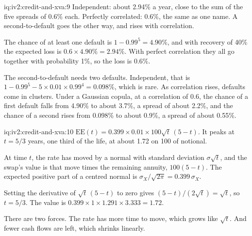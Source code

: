 \begin{solution}{iq:iv2:credit-and-xva:9}
Independent: about 2.94\% a year, close to the sum of the five spreads of 0.6\% each. Perfectly correlated: 0.6\%, the same as one name. A second-to-default goes the other way, and rises with correlation.

The chance of at least one default is $1 - 0.99^5 = 4.90\%$, and with recovery of 40\% the expected loss is $0.6 \times 4.90\% = 2.94\%$. With perfect correlation they all go together with probability 1\%, so the loss is $0.6\%$.

The second-to-default needs two defaults. Independent, that is $1 - 0.99^5 - 5 \times 0.01 \times 0.99^4 = 0.098\%$, which is rare. As correlation rises, defaults come in clusters. Under a Gaussian copula, at a correlation of 0.6, the chance of a first default falls from 4.90\% to about 3.7\%, a spread of about 2.2\%, and the chance of a second rises from 0.098\% to about 0.9\%, a spread of about 0.55\%.

\end{solution}

\begin{solution}{iq:iv2:credit-and-xva:10}
$\mathrm{EE}(t) = 0.399 \times 0.01 \times 100 \sqrt{t}\,(5 - t)$. It peaks at $t = 5/3$ years, one third of the life, at about 1.72 on 100 of notional.

At time $t$, the rate has moved by a normal with standard deviation $\sigma\sqrt{t}$, and the swap's value is that move times the remaining annuity, $100(5 - t)$. The expected positive part of a centred normal is $\sigma_X/\sqrt{2\pi} = 0.399\,\sigma_X$.

Setting the derivative of $\sqrt{t}\,(5 - t)$ to zero gives $(5 - t)/(2\sqrt{t}) = \sqrt{t}$, so $t = 5/3$. The value is $0.399 \times 1 \times 1.291 \times 3.333 = 1.72$.

There are two forces. The rate has more time to move, which grows like $\sqrt{t}$. And fewer cash flows are left, which shrinks linearly.

\end{solution}

